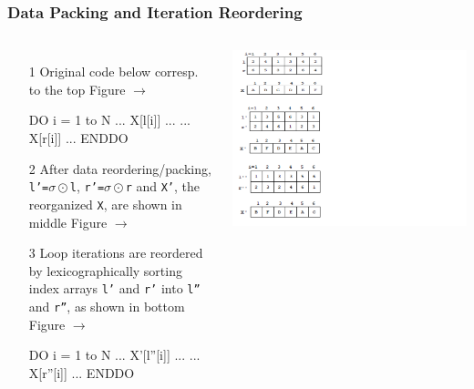 \documentclass{beamer}
\begin{document}
\begin{frame}[fragile,t]
  \frametitle{Data Packing and Iteration Reordering}

\begin{columns}
\begin{itemize}
\item[1] Original code below corresp.\\
to the top Figure $\rightarrow$
\begin{colorcode}
DO i = 1 to N
  ... X[l[i]] ...
  ... X[r[i]] ...
ENDDO
\end{colorcode}
\smallskip

\item[2] After data reordering/packing, {\tt l'=$\sigma\odot$l},
{\tt r'=$\sigma\odot$r} and {\tt X'}, the reorganized {\tt X},
are shown in middle Figure $\rightarrow$\smallskip

\item[3] Loop iterations are reordered
        by lexicographically sorting index arrays
        {\tt l'} and {\tt r'} into {\tt l''} and {\tt r''},
        as shown in bottom Figure $\rightarrow$
\begin{colorcode}
DO i = 1 to N
  ... X'[l''[i]] ...
  ... X[r''[i]] ...
ENDDO
\end{colorcode}
\end{itemize}
\includegraphics[width=59ex]{Figures/RedorderingDaIt}
\end{columns}

 
\end{frame}
\end{document}
